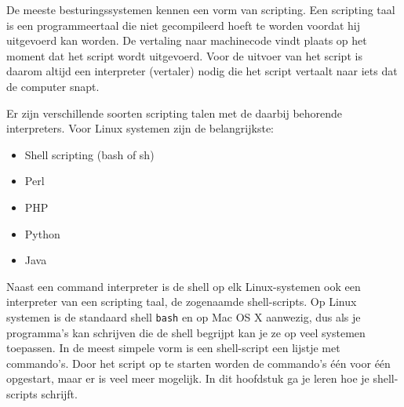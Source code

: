 De meeste besturingssystemen kennen een vorm van scripting. Een scripting taal is een programmeertaal die niet gecompileerd hoeft te worden voordat hij uitgevoerd kan worden. De vertaling naar machinecode vindt plaats op het moment dat het script wordt uitgevoerd. Voor de uitvoer van het script is daarom altijd een interpreter (vertaler) nodig die het script vertaalt naar iets dat de computer snapt.

Er zijn verschillende soorten scripting talen met de daarbij behorende interpreters. Voor Linux systemen zijn de belangrijkste:
\begin{itemize}
\item Shell scripting (bash of sh)
\item Perl
\item PHP
\item Python
\item Java
\end{itemize}

Naast een command interpreter is de shell op elk Linux-systemen ook een interpreter van een scripting taal, de zogenaamde shell-scripts. Op Linux systemen is de standaard shell \texttt{bash} en op Mac OS X aanwezig, dus als je programma's kan schrijven die de shell begrijpt kan je ze op veel systemen toepassen. In de meest simpele vorm is een shell-script een lijstje met commando's. Door het script op te starten worden de commando's \'e\'en voor \'e\'en opgestart, maar er is veel meer mogelijk. In dit hoofdstuk ga je leren hoe je shell-scripts schrijft.
